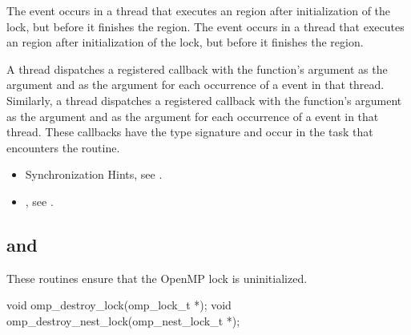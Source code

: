 \events
The  event occurs in a thread that executes an 
 region after initialization of the 
lock, but before it finishes the region. The  
event occurs in a thread that executes an  
region after initialization of the lock, but before it finishes the region.

\tools
A thread dispatches a registered  
callback with the function's  argument as the  argument 
and  as the  argument for each 
occurrence of a  event in that thread. Similarly, 
a thread dispatches a registered  
callback with the function's  argument as the  argument 
and  as the  argument for each 
occurrence of a  event in that thread. These 
callbacks have the type signature 
and occur in the task that encounters the routine.

\crossreferences
\begin{itemize}
\item Synchronization Hints, see .

\item {}, see
.
\end{itemize}



\subsection[\hcode{omp_destroy_lock} and \hcode{omp_destroy_nest_lock}]{ and\\ }
\label{subsec:omp_destroy_lock and omp_destroy_nest_lock}
\summary
These routines ensure that the OpenMP lock is uninitialized.

\format
\begin{ccppspecific}
\begin{ompcFunction}
void omp_destroy_lock(omp_lock_t *);
void omp_destroy_nest_lock(omp_nest_lock_t *);
\end{ompcFunction}
\end{ccppspecific}

